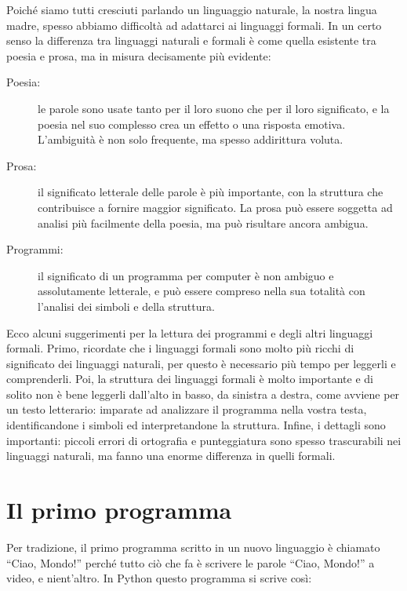 \documentclass[10pt]{book}
\begin{document}
Poiché siamo tutti cresciuti parlando un linguaggio naturale, la nostra lingua madre, spesso abbiamo difficoltà ad adattarci ai linguaggi formali. In un certo senso la differenza tra linguaggi naturali e formali è come quella esistente tra poesia e prosa, ma in misura decisamente più evidente:

\begin{description}

\item[Poesia:] le parole sono usate tanto per il loro suono che per il loro     significato, e la poesia nel suo complesso crea un effetto o una risposta emotiva. L'ambiguità è non solo frequente, ma spesso addirittura voluta.

\item[Prosa:] il significato letterale delle parole è più importante, con la    struttura che contribuisce a fornire maggior significato. La prosa può essere soggetta ad analisi più facilmente della poesia, ma può risultare ancora ambigua.

\item[Programmi:] il significato di un programma per computer è non ambiguo e    assolutamente letterale, e può essere compreso nella sua totalità con l'analisi dei simboli e della struttura.

\end{description}

Ecco alcuni suggerimenti per la lettura dei programmi e degli altri linguaggi formali. Primo, ricordate che i linguaggi formali sono molto più ricchi di       significato dei linguaggi naturali, per questo è necessario più tempo per leggerli e comprenderli. Poi, la struttura dei linguaggi formali è molto importante e di solito non è bene leggerli dall'alto in basso, da sinistra a destra, come avviene per un testo letterario: imparate ad analizzare il programma nella vostra testa, identificandone i simboli ed interpretandone la struttura. Infine, i dettagli sono importanti: piccoli errori di ortografia e punteggiatura sono spesso trascurabili nei linguaggi naturali, ma fanno una enorme differenza in quelli formali.


\section{Il primo programma}
\label{hello}

Per tradizione, il primo programma scritto in un nuovo linguaggio è
chiamato ``Ciao, Mondo!'' perché tutto ciò che fa è scrivere le parole ``Ciao, Mondo!'' a video, e nient'altro. In Python questo programma si scrive così:
\end{document}
